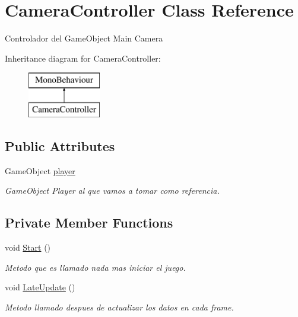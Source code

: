 \hypertarget{class_camera_controller}{}\section{Camera\+Controller Class Reference}
\label{class_camera_controller}


Controlador del Game\+Object Main Camera  


Inheritance diagram for Camera\+Controller\+:\begin{figure}[H]
\begin{center}
\leavevmode
\includegraphics[height=2.000000cm]{class_camera_controller}
\end{center}
\end{figure}
\subsection*{Public Attributes}
\begin{DoxyCompactItemize}
\item 
Game\+Object \hyperlink{class_camera_controller_aae794ec2d17947f671ce0eaef9aac8b7}{player}
\begin{DoxyCompactList}\small\item\em Game\+Object Player al que vamos a tomar como referencia. \end{DoxyCompactList}\end{DoxyCompactItemize}
\subsection*{Private Member Functions}
\begin{DoxyCompactItemize}
\item 
void \hyperlink{class_camera_controller_ad4a238c6f7db3ee003302a245d860860}{Start} ()
\begin{DoxyCompactList}\small\item\em Metodo que es llamado nada mas iniciar el juego. \end{DoxyCompactList}\item 
void \hyperlink{class_camera_controller_afcd241727886518c21b9609193e32d18}{Late\+Update} ()
\begin{DoxyCompactList}\small\item\em Metodo llamado despues de actualizar los datos en cada frame. \end{DoxyCompactList}\end{DoxyCompactItemize}
